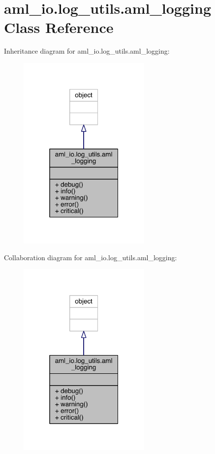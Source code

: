 \hypertarget{classaml__io_1_1log__utils_1_1aml__logging}{}\section{aml\+\_\+io.\+log\+\_\+utils.\+aml\+\_\+logging Class Reference}
\label{classaml__io_1_1log__utils_1_1aml__logging}


Inheritance diagram for aml\+\_\+io.\+log\+\_\+utils.\+aml\+\_\+logging\+:\nopagebreak
\begin{figure}[H]
\begin{center}
\leavevmode
\includegraphics[width=184pt]{classaml__io_1_1log__utils_1_1aml__logging__inherit__graph}
\end{center}
\end{figure}


Collaboration diagram for aml\+\_\+io.\+log\+\_\+utils.\+aml\+\_\+logging\+:\nopagebreak
\begin{figure}[H]
\begin{center}
\leavevmode
\includegraphics[width=184pt]{classaml__io_1_1log__utils_1_1aml__logging__coll__graph}
\end{center}
\end{figure}
